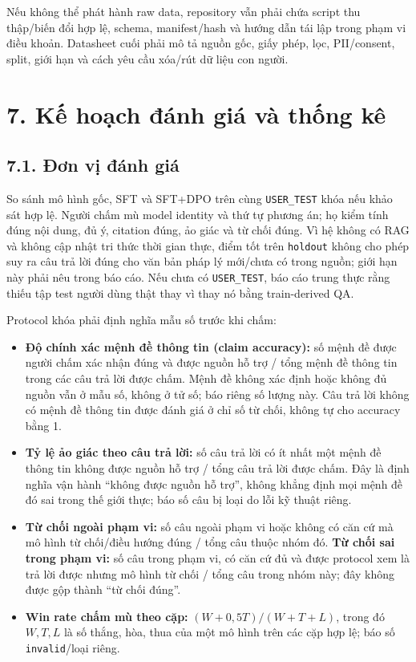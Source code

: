\documentclass[11pt,a4paper]{article}
\providecommand{\tightlist}{\setlength{\itemsep}{0pt}\setlength{\parskip}{0pt}}
\begin{document}
Nếu không thể phát hành raw data, repository vẫn phải chứa script thu
thập/biến đổi hợp lệ, schema, manifest/hash và hướng dẫn tái lập trong
phạm vi điều khoản. Datasheet cuối phải mô tả nguồn gốc, giấy phép, lọc,
PII/consent, split, giới hạn và cách yêu cầu xóa/rút dữ liệu con người.

\section{7. Kế hoạch đánh giá và thống
kê}\label{kux1ebf-houx1ea1ch-ux111uxe1nh-giuxe1-vuxe0-thux1ed1ng-kuxea}

\subsection{7.1. Đơn vị đánh
giá}\label{ux111ux1a1n-vux1ecb-ux111uxe1nh-giuxe1}

So sánh mô hình gốc, SFT và SFT+DPO trên cùng \nolinkurl{USER_TEST} khóa
nếu khảo sát hợp lệ. Người chấm mù model identity và thứ tự phương án;
họ kiểm tính đúng nội dung, đủ ý, citation đúng, ảo giác và từ chối
đúng. Vì hệ không có RAG và không cập nhật tri thức thời gian thực, điểm
tốt trên \nolinkurl{holdout} không cho phép suy ra câu trả lời đúng cho
văn bản pháp lý mới/chưa có trong nguồn; giới hạn này phải nêu trong báo
cáo. Nếu chưa có \nolinkurl{USER_TEST}, báo cáo trung thực rằng thiếu
tập test người dùng thật thay vì thay nó bằng train-derived QA.

Protocol khóa phải định nghĩa mẫu số trước khi chấm:

\begin{itemize}
\tightlist
\item
  \textbf{Độ chính xác mệnh đề thông tin (claim accuracy):} số mệnh đề
  được người chấm xác nhận đúng và được nguồn hỗ trợ / tổng mệnh đề
  thông tin trong các câu trả lời được chấm. Mệnh đề không xác định hoặc
  không đủ nguồn vẫn ở mẫu số, không ở tử số; báo riêng số lượng này.
  Câu trả lời không có mệnh đề thông tin được đánh giá ở chỉ số từ chối,
  không tự cho accuracy bằng 1.
\item
  \textbf{Tỷ lệ ảo giác theo câu trả lời:} số câu trả lời có ít nhất một
  mệnh đề thông tin không được nguồn hỗ trợ / tổng câu trả lời được
  chấm. Đây là định nghĩa vận hành ``không được nguồn hỗ trợ'', không
  khẳng định mọi mệnh đề đó sai trong thế giới thực; báo số câu bị loại
  do lỗi kỹ thuật riêng.
\item
  \textbf{Từ chối ngoài phạm vi:} số câu ngoài phạm vi hoặc không có căn
  cứ mà mô hình từ chối/điều hướng đúng / tổng câu thuộc nhóm đó.
  \textbf{Từ chối sai trong phạm vi:} số câu trong phạm vi, có căn cứ đủ
  và được protocol xem là trả lời được nhưng mô hình từ chối / tổng câu
  trong nhóm này; đây không được gộp thành ``từ chối đúng''.
\item
  \textbf{Win rate chấm mù theo cặp:} \((W+0{,}5T)/(W+T+L)\), trong đó
  \(W,T,L\) là số thắng, hòa, thua của một mô hình trên các cặp hợp lệ;
  báo số \nolinkurl{invalid}/loại riêng.
\end{itemize}
\end{document}
